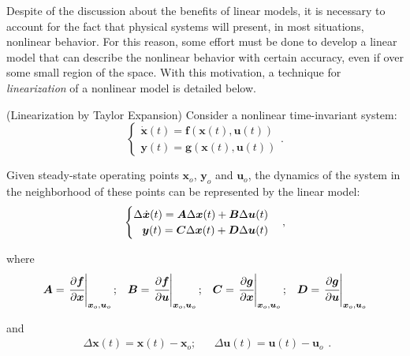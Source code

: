 \documentclass[a4paper,11pt]{book}
\numberwithin{figure}{chapter}
\numberwithin{equation}{chapter}
\numberwithin{table}{chapter}
\newtheorem{theorem}{Theorem}[chapter]
\theoremstyle{definition}
\newcounter{boxed-theorem}
\newenvironment{boxed-theorem}[1]
{\colorlet{shadecolor}{pastelBlue2!10} \begin{shaded} \begin{theorem}{#1}}
{\end{theorem} \end{shaded}}
\newcounter{boxed-definition}
\newcounter{boxed-example}
\begin{document}
Despite of the discussion about the benefits of linear models, it is necessary to account for the fact that physical systems will present, in most situations, nonlinear behavior. For this reason, some effort must be done to develop a linear model that can describe the nonlinear behavior with certain accuracy, even if over some small region of the space. With this motivation, a technique for \textit{linearization} of a nonlinear model is detailed below.

\begin{boxed-theorem}{(Linearization by Taylor Expansion)} \label{th:linearization}
    Consider a nonlinear time-invariant system:
    \begin{equation} \label{eq:SSRepr03}
    \begin{cases}
        \dot{\bm{x}}(t) = \bm{f}(\bm{x}(t), \bm{u}(t)) \\
        \bm{y}(t) = \bm{g}(\bm{x}(t), \bm{u}(t))
    \end{cases}
    .\end{equation}
    
    Given steady-state operating points $\bm{x}_o$, $\bm{y}_o$ and $\bm{u}_o$, the dynamics of the system in the neighborhood of these points can be represented by the linear model: 
    \begin{align}
    \begin{cases}
        \Delta \dot{\bm{x}}(t) = \bm{A}\Delta \bm{x}(t) + \bm{B}\Delta \bm{u}(t) & \\
        \hfill \bm{y}(t) = \bm{C}\Delta \bm{x}(t) + \bm{D}\Delta \bm{u}(t) &
    \end{cases}
    ,\end{align}
    
    \noindent where
    \begin{equation}
    \begin{matrix}
        \bm{A} = \left. \cfrac{\partial \bm{f}}{\partial \bm{x}} \right|_{\bm{x}_o, \bm{u}_o}; & \bm{B} = \left. \cfrac{\partial \bm{f}}{\partial \bm{u}} \right|_{\bm{x}_o, \bm{u}_o}; & \bm{C} = \left. \cfrac{\partial \bm{g}}{\partial \bm{x}} \right|_{\bm{x}_o,  \bm{u}_o}; & \bm{D} = \left. \cfrac{\partial \bm{g}}{\partial \bm{u}} \right|_{\bm{x}_o, \bm{u}_o} 
    \end{matrix}
    \end{equation}
    
    \noindent and
    \begin{equation}
    \begin{matrix}
        \Delta \bm{x}(t) = \bm{x}(t) - \bm{x}_o; & & \Delta \bm{u}(t) = \bm{u}(t) - \bm{u}_o
    \end{matrix}
    .\end{equation}
\end{boxed-theorem}
\end{document}
